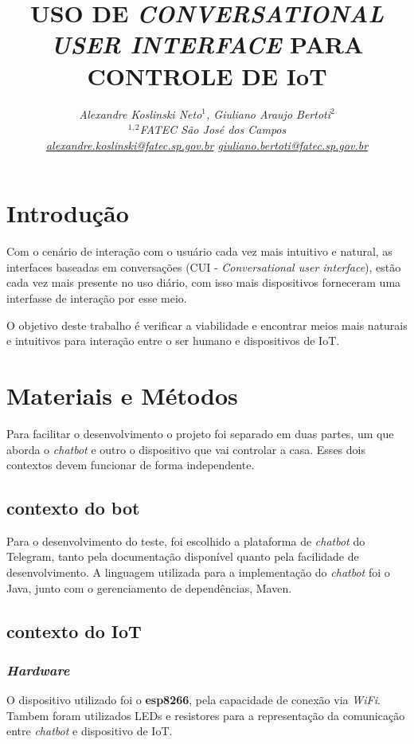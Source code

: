 \documentclass[10pt,a4paper,twocolumn]{article}
\title{\LARGE \bf
USO DE \textit{CONVERSATIONAL USER INTERFACE} PARA CONTROLE DE IoT
}
\author{\it
Alexandre Koslinski Neto$^{1}$, 
Giuliano Araujo Bertoti$^{2}$\\
$^{1,2}$FATEC São José dos Campos\\
\href{mailto:alexandre.koslinski@fatec.sp.gov.br}{alexandre.koslinski@fatec.sp.gov.br}
\href{mailto: giuliano.bertoti@fatec.sp.gov.br}{ giuliano.bertoti@fatec.sp.gov.br}
}
\begin{document}
 \vspace{-8ex}
  \date{}
\maketitle

\section{\bf Introdução}

Com o cenário de interação com o usuário cada vez mais intuitivo e natural, as interfaces baseadas em conversações (CUI - \textit{Conversational user interface}), estão cada vez mais presente no uso diário, com isso mais dispositivos forneceram uma interfasse de interação por esse meio.

O objetivo deste trabalho é verificar a viabilidade e encontrar meios mais naturais e intuitivos para interação entre o ser humano e dispositivos de IoT.

\section{\bf Materiais e Métodos}

Para facilitar o desenvolvimento o projeto foi separado em duas partes, um que aborda o \textit{chatbot} e outro o dispositivo que vai controlar a casa.
Esses dois contextos devem funcionar de forma independente.
\subsection{contexto do bot}
Para o desenvolvimento do teste, foi escolhido a plataforma de \textit{chatbot} do Telegram\cite{telegram}, tanto pela documentação disponível quanto pela facilidade de desenvolvimento. A linguagem utilizada para a implementação do \textit{chatbot} foi o Java, junto com o gerenciamento de dependências, Maven.

\subsection{contexto do IoT}
\subsubsection{\textit{Hardware}}
O dispositivo utilizado foi o \textbf{esp8266}\cite{esp}, pela capacidade de conexão via \textit{WiFi}. Tambem foram utilizados LEDs e resistores para a representação da comunicação entre \textit{chatbot} e dispositivo de IoT.
\end{document}
